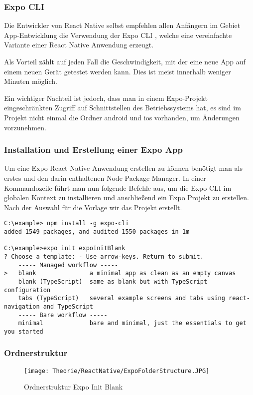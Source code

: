 \subsubsection{Expo CLI}
\label{expocli}
Die Entwickler von React Native selbst empfehlen allen Anfängern im Gebiet App-Entwicklung die
Verwendung der Expo CLI \cite{expocli}, welche eine vereinfachte Variante einer React Native Anwendung erzeugt.

Als Vorteil zählt auf jeden Fall die Geschwindigkeit, mit der eine neue App auf einem neuen Gerät
getestet werden kann. Dies ist meist innerhalb weniger Minuten möglich.

Ein wichtiger Nachteil ist jedoch, dass man in einem Expo-Projekt eingeschränkten Zugriff auf
Schnittstellen des Betriebssystems hat, es sind im Projekt nicht einmal die Ordner android und ios
vorhanden, um Änderungen vorzunehmen.

\subsubsection{Installation und Erstellung einer Expo App}
Um eine Expo React Native Anwendung erstellen zu können benötigt man als erstes  und
den darin enthaltenen Node Package Manager. In einer Kommandozeile führt man nun folgende Befehle
aus, um die Expo-CLI im globalen Kontext zu installieren und anschließend ein Expo Projekt zu
erstellen. Nach der Auswahl für die Vorlage wir das Projekt erstellt.

\begin{lstlisting}
C:\example> npm install -g expo-cli
added 1549 packages, and audited 1550 packages in 1m

C:\example>expo init expoInitBlank
? Choose a template: - Use arrow-keys. Return to submit.
    ----- Managed workflow -----
>   blank               a minimal app as clean as an empty canvas
    blank (TypeScript)  same as blank but with TypeScript configuration
    tabs (TypeScript)   several example screens and tabs using react-navigation and TypeScript
    ----- Bare workflow -----
    minimal             bare and minimal, just the essentials to get you started
\end{lstlisting}

\subsubsection{Ordnerstruktur}
\begin{figure}[H]
  \begin{center}
    \texttt{[image: Theorie/ReactNative/ExpoFolderStructure.JPG]}
    \caption{Ordnerstruktur Expo Init Blank}
  \end{center}
\end{figure}

